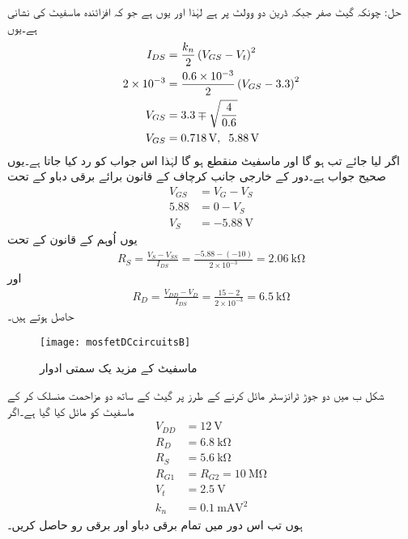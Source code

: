 حل: چونکہ گیٹ صفر جبکہ ڈرین دو وولٹ پر ہے لہٰذا  اور یوں   ہے جو کہ افزائندہ ماسفیٹ کی نشانی ہے۔یوں
\begin{align*}
I_{DS}&=\frac{k_n}{2} \left(V_{GS}-V_t \right )^{2}\\
2 \times 10^{-3}&=\frac{0.6 \times 10^{-3}}{2} \left(V_{GS}-3.3 \right )^{2}\\
V_{GS}&=3.3 \mp \sqrt{\frac{4}{0.6}}\\
V_{GS}&=\SI{0.718}{\volt}, \hspace{2mm} \SI{5.88}{\volt}
\end{align*}
اگر   لیا جائے تب   ہو گا اور ماسفیٹ منقطع ہو گا لہٰذا اس جواب کو رد کیا جاتا ہے۔یوں  صحیح جواب ہے۔دور کے خارجی جانب کرچاف کے قانون برائے برقی دباو کے تحت
\begin{align*}
V_{GS}&=V_G  - V_S\\
5.88&=0-V_S\\
V_S&=\SI{-5.88}{\volt}
\end{align*}
یوں اُوہم کے قانون کے تحت
\begin{align*}
R_S=\frac{V_S-V_{SS}}{I_{DS}}=\frac{-5.88-(-10)}{2 \times 10^{-3}}=\SI{2.06}{\kilo \ohm}
\end{align*}
اور
\begin{align*}
R_D=\frac{V_{DD}-V_{D}}{I_{DS}}=\frac{15-2}{2 \times 10^{-3}}=\SI{6.5}{\kilo \ohm}
\end{align*}
حاصل ہوتے ہیں۔
\begin{figure}
\centering
\texttt{[image: mosfetDCcircuitsB]}
\caption{ماسفیٹ کے مزید یک سمتی ادوار}
\label{شکل_ماسفیٹ_کے_یک_سمتی_ادوار_ب}
\end{figure}
شکل  ب میں دو جوڑ ٹرانزسٹر مائل کرنے کے طرز پر گیٹ کے ساتھ دو مزاحمت منسلک کر کے ماسفیٹ کو مائل کیا گیا ہے۔اگر
\begin{align*}
V_{DD}&=\SI{12}{\volt}\\
R_D&=\SI{6.8}{\kilo \ohm}\\
R_S&=\SI{5.6}{\kilo \ohm}\\
R_{G1}&=R_{G2}=\SI{10}{\mega \ohm}\\
V_t&=\SI{2.5}{\volt}\\
k_n&=\SI{0.1}{\milli \ampere \volt \squared}
\end{align*}
ہوں تب اس دور میں تمام برقی دباو اور برقی رو حاصل کریں۔

